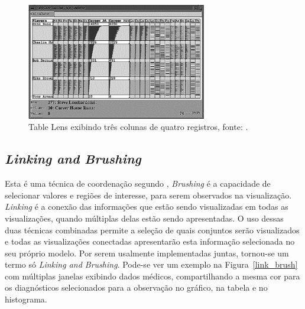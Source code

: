 \documentclass[article,11pt,oneside,a4paper]{abntex2} %
\begin{document}
	\begin{figure}[!h]
	{\centering
		\includegraphics[width=0.7\textwidth]{figuras/table_lens2.png}
		\caption{Table Lens exibindo três colunas de quatro registros, fonte: \cite{pirolli}.}
		\label{table_lens}
	}
	\end{figure}	

	\newpage
	\subsection{\textit{Linking and Brushing}}
		\hspace{13pt}
	Esta é uma técnica de coordenação segundo ,  \textit{Brushing} é a capacidade de selecionar valores e regiões de interesse, para serem observados na visualização. \textit{Linking} é a conexão das informações que estão sendo visualizadas em todas as visualizações, quando múltiplas delas estão sendo apresentadas. O uso dessas duas técnicas combinadas permite a seleção de quais conjuntos serão visualizados e todas as visualizações conectadas apresentarão esta informação selecionada no seu próprio modelo. Por serem usalmente implementadas juntas, tornou-se um termo só \textit{Linking and Brushing}. Pode-se ver um exemplo na Figura~\ref{link_brush} com múltiplas janelas exibindo dados médicos, compartilhando a mesma cor para os diagnósticos selecionados para a observação no gráfico, na tabela e no histograma.
\end{document}
